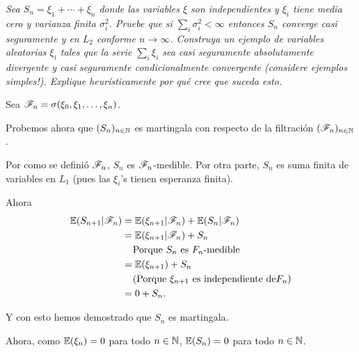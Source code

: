 \emph{
    Sea $S_n=\xi_1+\cdots+\xi_n$ donde las variables $\xi$ son independientes y $\xi_i$ tiene 
    media cero y varianza finita $\sigma_i^2$. Pruebe que si $\sum_i \sigma_i^2<\infty$ entonces 
    $S_n$ converge casi seguramente y en $L_2$ conforme $n\to\infty$. Construya un ejemplo de 
    variables aleatorias $\xi_i$ tales que la serie $\sum_i \xi_i$ sea casi seguramente absolutamente 
    divergente y casi seguramente condicionalmente convergente (considere ejemplos simples!). 
    Explique heur\'isticamente por qu\'e cree que suceda esto.
}

\afterstatement\par\null

Sea $\mathscr{F}_n = \sigma( \xi_0, \xi_1, \dots, \xi_n)$.\par\null


Probemos ahora que $(S_n)_{n \in \mathbb{N}}$ es martingala con respecto de la \newline 
filtración $(\mathscr{F}_n)_{n \in \mathbb{N}}$.\par\null

Por como se definió $\mathscr{F}_n$, $S_n$ es $\mathscr{F}_n$-medible. Por otra parte, $S_n$ es suma finita de variables en $L_1$ 
(pues las $\xi_i$'s tienen esperanza finita).\par\null

Ahora
\begin{align}
    \mathbb{E}(S_{n+1} | \mathscr{F}_n)  &=  \mathbb{E}(\xi_{n+1} | \mathscr{F}_n) + \mathbb{E}(S_n | \mathscr{F}_n)                       \\
                        &=  \mathbb{E}(\xi_{n+1} | \mathscr{F}_n) + S_n                                  \\
                        &\;\;\;\;\mbox{Porque $S_n$ es $F_n$-medible}                   \\
                        &=  \mathbb{E}(\xi_{n+1}) + S_n                                         \\
                        &\;\;\;\;\mbox{(Porque $\xi_{n+1}$ es independiente de$F_n$)}        	\\
                        &=  0 + S_n.                                                    \\
\end{align}\par\null

Y con esto hemos demostrado que $S_n$ es martingala.\par\null

Ahora, como $\mathbb{E}(\xi_n) = 0$ para todo $n \in \mathbb{N}$, $\mathbb{E}(S_n) = 0$ para todo $n \in \mathbb{N}$.

